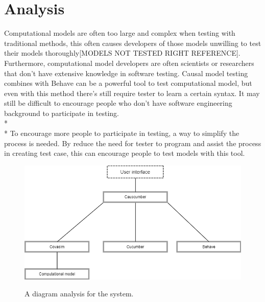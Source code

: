 \chapter{Analysis}
Computational models are often too large and complex when testing with traditional methods, this often causes developers of those models unwilling to test their models thoroughly[MODELS NOT TESTED RIGHT REFERENCE]. Furthermore, computational model developers are often scientists or researchers that don’t have extensive knowledge in software testing. Causal model testing combines with Behave can be a powerful tool to test computational model, but even with this method there’s still require tester to learn a certain syntax. It may still be difficult to encourage people who don’t have software engineering background to participate in testing. \\*\\*
To encourage more people to participate in testing, a way to simplify the process is needed. By reduce the need for tester to program and assist the process in creating test case, this can encourage people to test models with this tool. 

\begin{figure}[H]
	\centering
	\includegraphics[width=13cm]{figures/Analysis.png}\\
	\caption{A diagram analysis for the system.}
	\label{fig:figure2}
\end{figure}

